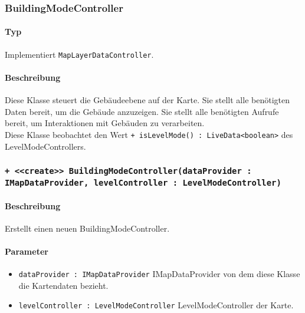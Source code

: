 \subsubsection{BuildingModeController}\label{App_Map_ViewModel_BuildingModeController}
\paragraph*{Typ}
Implementiert \texttt{MapLayerDataController}.
\paragraph*{Beschreibung}
Diese Klasse steuert die Gebäudeebene auf der Karte. Sie stellt alle benötigten Daten bereit, um die Gebäude anzuzeigen. 
Sie stellt alle benötigten Aufrufe bereit, um Interaktionen mit Gebäuden zu verarbeiten.\\
Diese Klasse beobachtet den Wert \texttt{+ isLevelMode() : LiveData<boolean>} des LevelModeControllers.

\subsubsection*{\texttt{+ <<create>> BuildingModeController(dataProvider : IMapDataProvider, levelController : LevelModeController)}}%
\paragraph*{Beschreibung}
Erstellt einen neuen BuildingModeController.
\paragraph*{Parameter}
\begin{itemize}
    \item \texttt{dataProvider : IMapDataProvider} IMapDataProvider von dem diese Klasse die Kartendaten bezieht.
    \item \texttt{levelController : LevelModeController} LevelModeController der Karte.
\end{itemize}
